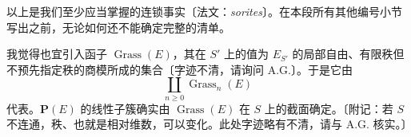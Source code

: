 以上是我们至少应当掌握的连锁事实〔法文：\textit{sorites}〕。在本段所有其他编号小节写出之前，无论如何还不能确定完整的清单。

我觉得也宜引入函子 $\operatorname{Grass}(E)$，其在 $S'$ 上的值为 $E_{S'}$ 的局部自由、有限秩但不预先指定秩的商模所成的集合〔字迹不清，请询问 A.G.〕。于是它由
\[
\coprod_{n\geq0}\operatorname{Grass}_n(E)
\]
代表。$\mathbf P(E)$ 的线性子簇确实由 $\operatorname{Grass}(E)$ 在 $S$ 上的截面确定。〔附记：若 $S$ 不连通，秩、也就是相对维数，可以变化。此处字迹略有不清，请与 A.G. 核实。〕

